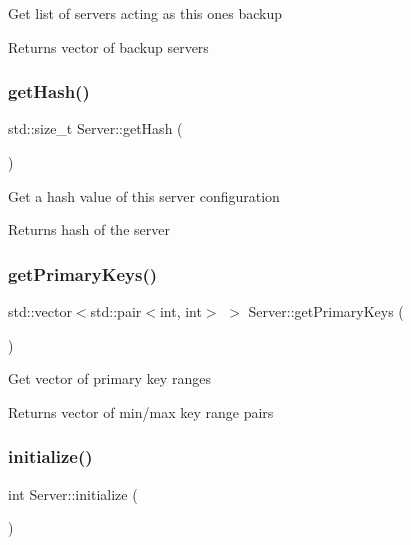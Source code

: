Get list of servers acting as this one\textquotesingle{}s backup

\begin{DoxyReturn}{Returns}
vector of backup servers 
\end{DoxyReturn}
\mbox{\label{classServer_adecf34082977620ca31ca8eab317cf6d}} 
\subsubsection{\texorpdfstring{get\+Hash()}{getHash()}}
{\footnotesize\ttfamily std\+::size\+\_\+t Server\+::get\+Hash (\begin{DoxyParamCaption}{ }\end{DoxyParamCaption})}

Get a hash value of this server configuration

\begin{DoxyReturn}{Returns}
hash of the server 
\end{DoxyReturn}
\mbox{\label{classServer_ad303d839086eee11137e6fc4a4bb95ab}} 
\subsubsection{\texorpdfstring{get\+Primary\+Keys()}{getPrimaryKeys()}}
{\footnotesize\ttfamily std\+::vector$<$std\+::pair$<$int, int$>$ $>$ Server\+::get\+Primary\+Keys (\begin{DoxyParamCaption}{ }\end{DoxyParamCaption})\hspace{0.3cm}{\ttfamily [inline]}}

Get vector of primary key ranges

\begin{DoxyReturn}{Returns}
vector of min/max key range pairs 
\end{DoxyReturn}
\mbox{\label{classServer_ae94d08657f48a3b51b411463f1137375}} 
\subsubsection{\texorpdfstring{initialize()}{initialize()}}
{\footnotesize\ttfamily int Server\+::initialize (\begin{DoxyParamCaption}{ }\end{DoxyParamCaption})\hspace{0.3cm}{\ttfamily [virtual]}}

